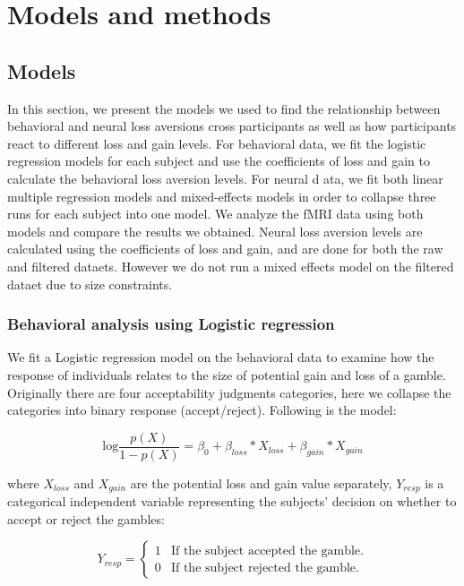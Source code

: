\documentclass[11pt]{article}
\begin{document}
\section{Models and methods}

\subsection{Models}

In this section, we present the models we used to find the relationship between 
behavioral and neural loss aversions cross participants as well as how 
participants react to different loss and gain levels. For behavioral data, we 
fit the logistic regression models for each subject and use the coefficients of 
loss and gain to calculate the behavioral loss aversion levels. For neural d
ata, we fit both linear multiple regression models and mixed-effects models in 
order to collapse three runs for each subject into one model. We analyze the 
fMRI data using both models and compare the results we obtained. Neural loss 
aversion levels are calculated using the coefficients of loss and gain, and 
are done for both the raw and filtered dataets. However we do not run a mixed 
effects model on the filtered dataet due to size constraints.   

\subsubsection{Behavioral analysis using Logistic regression}

We fit a Logistic regression model on the behavioral data to examine how the 
response of individuals relates to the size of potential gain and loss of a 
gamble. Originally there are four acceptability judgments categories, here we 
collapse the categories into binary response (accept/reject). 
Following is the model:

\begin{equation}
\textrm{log}\frac{p(X)}{1-p(X)} = \beta_0 + \beta_{loss} *X_{loss} + 
\beta_{gain} * X_{gain}
\end{equation}

where $X_{loss}$ and $X_{gain}$ are the potential loss and gain value 
separately, $Y_{resp}$ is a categorical independent variable representing the 
subjects' decision on whether to accept or reject the gambles:

\begin{displaymath}
Y_{resp} = \left \{ \begin{array}{ll}
1 & \textrm{If the subject accepted the gamble.} \\
0 & \textrm{If the subject rejected the gamble.}
\end{array} \right .
\end{displaymath}
\end{document}
